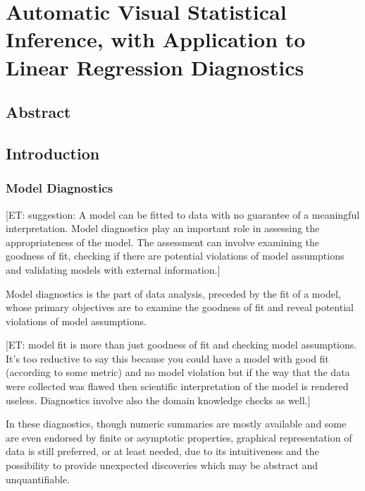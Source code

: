 \documentclass{monashthesis}
\begin{document}
\clearpage

\hypertarget{ch:paper1}{%
\chapter{Automatic Visual Statistical Inference, with Application to Linear Regression Diagnostics}\label{ch:paper1}}

\hypertarget{abstract-1}{%
\section{Abstract}\label{abstract-1}}

\hypertarget{introduction}{%
\section{Introduction}\label{introduction}}

\hypertarget{model-diagnostics}{%
\subsection{Model Diagnostics}\label{model-diagnostics}}

{[}ET: suggestion: A model can be fitted to data with no guarantee of a meaningful interpretation. Model diagnostics play an important role in assessing the appropriateness of the model. The assessment can involve examining the goodness of fit, checking if there are potential violations of model assumptions and validating models with external information.{]}

Model diagnostics is the part of data analysis, preceded by the fit of a model, whose primary objectives are to examine the goodness of fit and reveal potential violations of model assumptions.

{[}ET: model fit is more than just goodness of fit and checking model assumptions. It's too reductive to say this because you could have a model with good fit (according to some metric) and no model violation but if the way that the data were collected was flawed then scientific interpretation of the model is rendered useless. Diagnostics involve also the domain knowledge checks as well.{]}

In these diagnostics, though numeric summaries are mostly available and some are even endorsed by finite or asymptotic properties, graphical representation of data is still preferred, or at least needed, due to its intuitiveness and the possibility to provide unexpected discoveries which may be abstract and
unquantifiable.
\end{document}
